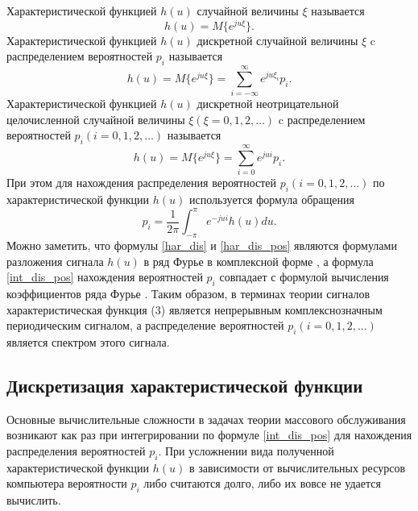 Характеристической функцией $h(u)$ случайной величины $\xi$ называется
\begin{equation}\label{har}
	h(u)=M\{e^{ju\xi}\}.
\end{equation}
Характеристической функцией $h(u)$ дискретной случайной величины $\xi$ c распределением вероятностей $p_i$ называется
\begin{equation}\label{har_dis}
	h(u)=M\{e^{ju\xi}\}=\sum_{i=-\infty}^{\infty}e^{ju\xi_i}p_i.
\end{equation}
Характеристической функцией $h(u)$ дискретной неотрицательной целочисленной случайной величины $\xi (\xi=0,1,2,\dots)$ c распределением вероятностей $p_i (i=0,1,2,\dots)$ называется
\begin{equation}\label{har_dis_pos}
	h(u)=M\{e^{ju\xi}\}=\sum_{i=0}^{\infty}e^{jui}p_i.
\end{equation}
При этом для нахождения распределения вероятностей $p_i (i=0,1,2,\dots)$ по характеристической функции $h(u)$ используется формула обращения
\begin{equation}\label{int_dis_pos}
	p_i=\frac{1}{2\pi}\int_{-\pi}^{\pi}e^{-jui}h(u)du.
\end{equation}
Можно заметить, что формулы \eqref{har_dis} и \eqref{har_dis_pos} являются формулами разложения сигнала $h(u)$ в ряд Фурье в комплексной форме \cite{долгополов2011ряды}, а формула \eqref{int_dis_pos} нахождения вероятностей $p_i$ совпадает с формулой вычисления коэффициентов ряда Фурье \cite{долгополов2011ряды}. Таким образом, в терминах теории сигналов характеристическая функция (3) является непрерывным комплекснозначным периодическим сигналом, а распределение вероятностей $p_i (i=0,1,2,\dots)$ является спектром этого сигнала.
\subsection{Дискретизация характеристической функции}
Основные вычислительные сложности в задачах теории массового обслуживания возникают как раз при интегрировании по формуле \eqref{int_dis_pos} для нахождения распределения вероятностей $p_i$. При усложнении вида полученной характеристической функции $h(u)$ в зависимости от вычислительных ресурсов компьютера вероятности $p_i$ либо считаются долго, либо их вовсе не удается вычислить.

